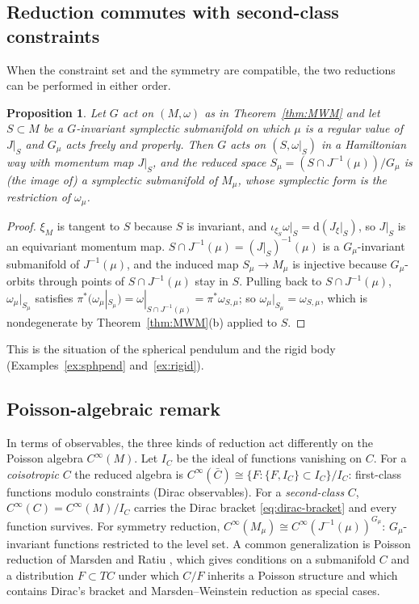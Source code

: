 \documentclass[11pt,a4paper]{article}
\numberwithin{equation}{section}
\theoremstyle{plain}
\newtheorem{proposition}[theorem]{Proposition}
\theoremstyle{definition}
\theoremstyle{remark}
\newcommand{\pb}[2]{\{#1,#2\}}
\newcommand{\dd}{\mathrm{d}}
\begin{document}
\subsection{Reduction commutes with second-class constraints}\label{sec:commute}

When the constraint set and the symmetry are compatible, the two reductions can be performed in either order.

\begin{proposition}\label{prop:commute}
Let $G$ act on $(M,\omega)$ as in Theorem~\ref{thm:MWM} and let $S\subset M$ be a $G$-invariant symplectic submanifold on which $\mu$ is a regular value of $J|_S$ and $G_\mu$ acts freely and properly. Then $G$ acts on $(S,\omega|_S)$ in a Hamiltonian way with momentum map $J|_S$, and the reduced space $S_\mu=(S\cap J^{-1}(\mu))/G_\mu$ is (the image of) a symplectic submanifold of $M_\mu$, whose symplectic form is the restriction of $\omega_\mu$.
\end{proposition}
\begin{proof}
$\xi_M$ is tangent to $S$ because $S$ is invariant, and $\iota_{\xi_S}\omega|_S=\dd(J_\xi|_S)$, so $J|_S$ is an equivariant momentum map. $S\cap J^{-1}(\mu)=(J|_S)^{-1}(\mu)$ is a $G_\mu$-invariant submanifold of $J^{-1}(\mu)$, and the induced map $S_\mu\to M_\mu$ is injective because $G_\mu$-orbits through points of $S\cap J^{-1}(\mu)$ stay in $S$. Pulling back to $S\cap J^{-1}(\mu)$, $\omega_\mu|_{S_\mu}$ satisfies $\pi^*(\omega_\mu|_{S_\mu})=\omega|_{S\cap J^{-1}(\mu)}=\pi^*\omega_{S,\mu}$; so $\omega_\mu|_{S_\mu}=\omega_{S,\mu}$, which is nondegenerate by Theorem~\ref{thm:MWM}(b) applied to $S$.
\end{proof}

This is the situation of the spherical pendulum and the rigid body (Examples~\ref{ex:sphpend} and~\ref{ex:rigid}).

\subsection{Poisson-algebraic remark}

In terms of observables, the three kinds of reduction act differently on the Poisson algebra $C^\infty(M)$. Let $I_C$ be the ideal of functions vanishing on $C$. For a \emph{coisotropic} $C$ the reduced algebra is $C^\infty(\bar C)\cong\{F:\pb F{I_C}\subset I_C\}/I_C$: first-class functions modulo constraints (Dirac observables). For a \emph{second-class} $C$, $C^\infty(C)=C^\infty(M)/I_C$ carries the Dirac bracket \eqref{eq:dirac-bracket} and every function survives. For symmetry reduction, $C^\infty(M_\mu)\cong C^\infty(J^{-1}(\mu))^{G_\mu}$: $G_\mu$-invariant functions restricted to the level set. A common generalization is Poisson reduction of Marsden and Ratiu \cite{mr1986}, which gives conditions on a submanifold $C$ and a distribution $F\subset TC$ under which $C/F$ inherits a Poisson structure and which contains Dirac's bracket and Marsden--Weinstein reduction as special cases.
\end{document}
